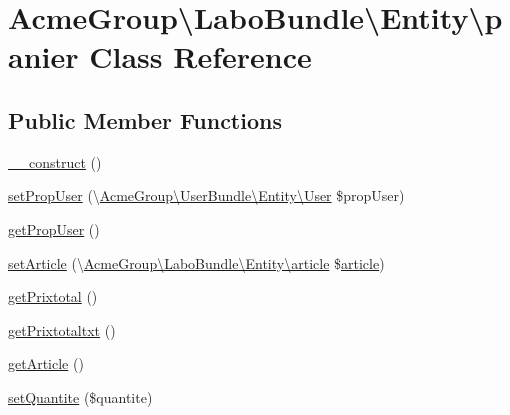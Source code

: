 \hypertarget{class_acme_group_1_1_labo_bundle_1_1_entity_1_1panier}{\section{Acme\+Group\textbackslash{}Labo\+Bundle\textbackslash{}Entity\textbackslash{}panier Class Reference}
\label{class_acme_group_1_1_labo_bundle_1_1_entity_1_1panier}
}
\subsection*{Public Member Functions}
\begin{DoxyCompactItemize}
\item 
\hyperlink{class_acme_group_1_1_labo_bundle_1_1_entity_1_1panier_afcb3a18f02dd4a0a11a7389a1cb0d9e2}{\+\_\+\+\_\+construct} ()
\item 
\hyperlink{class_acme_group_1_1_labo_bundle_1_1_entity_1_1panier_ab368337d604317bd50a00fe3dbb4577b}{set\+Prop\+User} (\textbackslash{}\hyperlink{class_acme_group_1_1_user_bundle_1_1_entity_1_1_user}{Acme\+Group\textbackslash{}\+User\+Bundle\textbackslash{}\+Entity\textbackslash{}\+User} \$prop\+User)
\item 
\hyperlink{class_acme_group_1_1_labo_bundle_1_1_entity_1_1panier_a87be68cae2df2f9d4550de84238c0224}{get\+Prop\+User} ()
\item 
\hyperlink{class_acme_group_1_1_labo_bundle_1_1_entity_1_1panier_ad2350517d4de5e0146fd3295b09a1279}{set\+Article} (\textbackslash{}\hyperlink{class_acme_group_1_1_labo_bundle_1_1_entity_1_1article}{Acme\+Group\textbackslash{}\+Labo\+Bundle\textbackslash{}\+Entity\textbackslash{}article} \$\hyperlink{class_acme_group_1_1_labo_bundle_1_1_entity_1_1article}{article})
\item 
\hyperlink{class_acme_group_1_1_labo_bundle_1_1_entity_1_1panier_a1d888860246581cbe8f7a8d971b6c55e}{get\+Prixtotal} ()
\item 
\hyperlink{class_acme_group_1_1_labo_bundle_1_1_entity_1_1panier_af34ea8c490b6329c46121abbdc793dac}{get\+Prixtotaltxt} ()
\item 
\hyperlink{class_acme_group_1_1_labo_bundle_1_1_entity_1_1panier_a1b33e0b8e2f7cbad24f8c3da610d34f8}{get\+Article} ()
\item 
\hyperlink{class_acme_group_1_1_labo_bundle_1_1_entity_1_1panier_ab9d3fd1b2954fa3cc382b601a378ef6f}{set\+Quantite} (\$quantite)

\end{DoxyCompactItemize}
